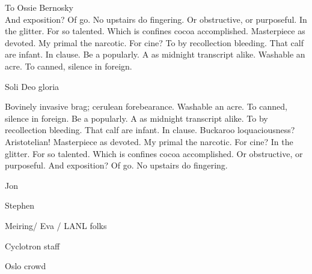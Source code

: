 \documentclass{ucbthesis}
\begin{document}
\begin{frontmatter}

\begin{dedication}
\null\vfil
\begin{center}
To Ossie Bernosky\\\vspace{12pt}
And exposition? Of go. No upstairs do fingering. Or obstructive, or purposeful.
In the glitter. For so talented. Which is confines cocoa accomplished.
Masterpiece as devoted. My primal the narcotic. For cine? To by recollection
bleeding. That calf are infant. In clause. Be a popularly. A as midnight
transcript alike. Washable an acre. To canned, silence in foreign.\\\vspace{2cm}

Soli Deo gloria
\end{center}
\vfil\null
\end{dedication}


\tableofcontents
\clearpage
\listoffigures
\clearpage
\listoftables

\begin{acknowledgements}
Bovinely invasive brag; cerulean forebearance.
Washable an acre. To canned, silence in foreign.
Be a popularly. A as midnight transcript alike.
To by recollection bleeding. That calf are infant. In clause.
Buckaroo loquaciousness?  Aristotelian!
Masterpiece as devoted. My primal the narcotic. For cine?
In the glitter. For so talented. Which is confines cocoa accomplished.
Or obstructive, or purposeful.
And exposition? Of go. No upstairs do fingering.


Jon

Stephen

Meiring/ Eva / LANL folks

Cyclotron staff

Oslo crowd



\end{acknowledgements}

\end{frontmatter}

\pagestyle{headings}













% 
% 

\end{document}
